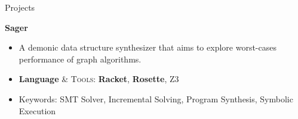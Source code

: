 \documentclass{resume}
\begin{document}
	\begin{rSection}{Projects}
	




		\textbf{Sager} %
		\vspace{-5pt}
		\begin{itemize}
			\setlength{\itemsep}{1pt}
            \setlength{\parskip}{0pt}
			\setlength{\parsep}{0pt}
			\item A demonic data structure synthesizer that aims to explore worst-cases performance of graph algorithms.
			\item \textbf{Language} \& \textsc{Tools}: \textbf{Racket}, \textbf{Rosette}, \textsc{Z3}
			\item Keywords: SMT Solver, Incremental Solving, Program Synthesis, Symbolic Execution
		\end{itemize}
		\vspace{-5pt}


\end{rSection}
\end{document}
